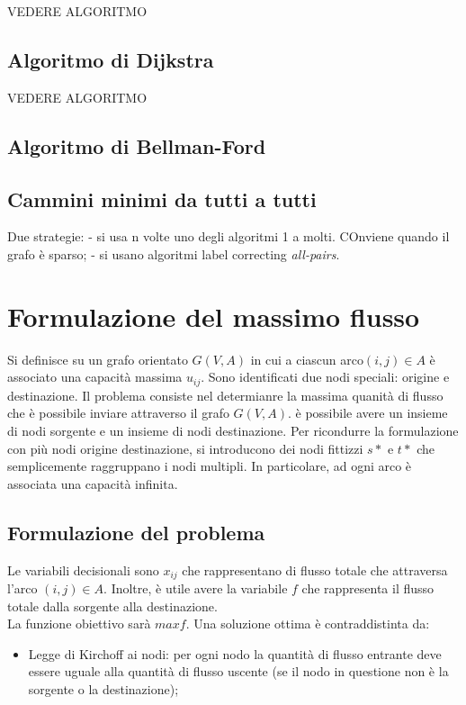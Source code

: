 \documentclass{article}
\begin{document}
VEDERE ALGORITMO 
\subsection{Algoritmo di Dijkstra}

VEDERE ALGORITMO 

\subsection{Algoritmo di Bellman-Ford}

\subsection{Cammini minimi da tutti a tutti}
Due strategie:
- si usa n volte uno degli algoritmi 1 a molti. COnviene quando il grafo è sparso;
- si usano algoritmi label correcting \textit{all-pairs}.

\section{Formulazione del massimo flusso}
Si definisce su un grafo orientato $G(V,A)$ in cui a ciascun arco$(i,j) \in A$
è associato una capacità massima $u_{ij}$. Sono identificati due nodi speciali:
origine e destinazione. Il problema consiste nel determianre la massima quanità 
di flusso che è possibile inviare attraverso il grafo $G(V,A)$.
è possibile avere un insieme di nodi sorgente e un insieme di nodi destinazione.
Per ricondurre la formulazione con più nodi origine destinazione, si introducono 
dei nodi fittizzi $s*$ e $t*$ che semplicemente raggruppano i nodi multipli. In 
particolare, ad ogni arco è associata una capacità infinita.

\subsection{Formulazione del problema}
Le variabili decisionali sono $x_{ij}$ che rappresentano di flusso totale che 
attraversa l'arco $(i,j) \in A$. Inoltre, è utile avere la variabile $f$ 
che 
rappresenta il flusso totale dalla sorgente alla destinazione.\\ 
La funzione obiettivo sarà $max f$. Una soluzione ottima è contraddistinta da:
\begin{itemize}
  \item Legge di Kirchoff ai nodi: per ogni nodo la quantità di flusso entrante 
    deve essere uguale alla quantità di flusso uscente (se il nodo in questione 
    non è la sorgente o la destinazione);
\end{itemize}
\end{document}
